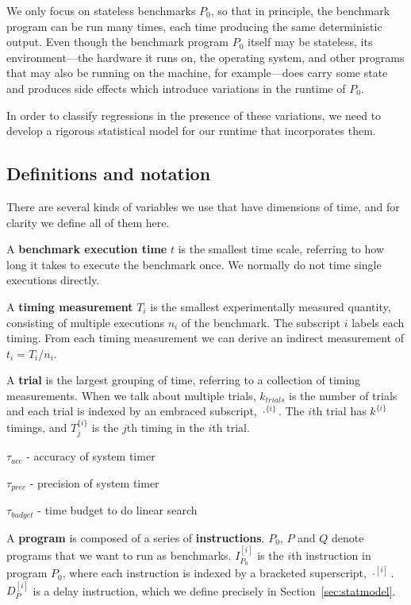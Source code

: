 \documentclass[conference]{IEEEtran}
\begin{document}
We only focus on stateless benchmarks $P_0$, so that in principle, the benchmark program can be run many times, each time producing the same deterministic output. Even though the benchmark program $P_0$ itself may be stateless, its environment---the hardware it runs on, the operating system, and other programs that may also be running on the machine, for example---does carry some state and produces side effects which introduce variations in the runtime of $P_0$.

In order to classify regressions in the presence of these variations, we need to develop a rigorous statistical model for our runtime that incorporates them.

\subsection{Definitions and notation}

There are several kinds of variables we use that have dimensions of time, and for clarity we define all of them here.

A \textbf{benchmark execution time} $t$ is the smallest time scale, referring to how long it takes to execute the benchmark once. We normally do not time single executions directly.

A \textbf{timing measurement} $T_i$ is the smallest experimentally measured quantity, consisting of multiple executions $n_i$ of the benchmark. The subscript $i$ labels each timing. From each timing measurement we can derive an indirect measurement of $t_i = T_i/n_i$.

A \textbf{trial} is the largest grouping of time, referring to a collection of timing measurements. When we talk about multiple trials, $k_{trials}$ is the number of trials and each trial is indexed by an embraced subscript, $\cdot^{\{i\}}$. The $i$th trial has $k^{\{i\}}$ timings, and $T^{\{i\}}_j$ is the $j$th timing in the $i$th trial.

$\tau_{acc}$ - accuracy of system timer

$\tau_{prec}$ - precision of system timer

$\tau_{budget}$ - time budget to do linear search

A \textbf{program} is composed of a series of \textbf{instructions}. $P_0$, $P$ and $Q$ denote programs that we want to run as benchmarks. $I^{[i]}_{P_0}$ is the $i$th instruction in program $P_0$, where each instruction is indexed by a bracketed superscript, $\cdot^{[i]}$. $D^{[i]}_{P}$ is a delay instruction, which we define precisely in Section~\ref{sec:statmodel}.
\end{document}
